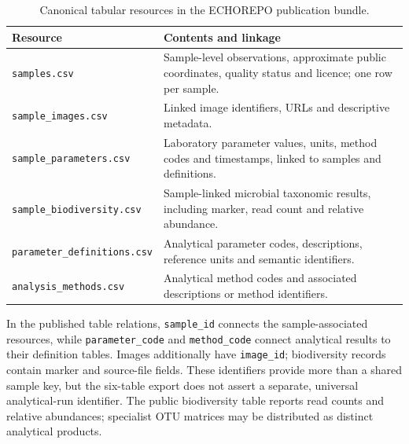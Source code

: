 \documentclass[11pt,a4paper]{article}
\newcommand{\code}[1]{\texttt{#1}}
\begin{document}
\begin{table}[htbp]
\centering\small
\caption{Canonical tabular resources in the ECHOREPO publication bundle.}
\label{tab:canonical}
\begin{tabularx}{\linewidth}{@{}p{4.7cm}X@{}}
\toprule
Resource & Contents and linkage \\
\midrule
\code{samples.csv} & Sample-level observations, approximate public coordinates, quality status and licence; one row per sample.\\
\code{sample\_images.csv} & Linked image identifiers, URLs and descriptive metadata.\\
\code{sample\_parameters.csv} & Laboratory parameter values, units, method codes and timestamps, linked to samples and definitions.\\
\code{sample\_biodiversity.csv} & Sample-linked microbial taxonomic results, including marker, read count and relative abundance.\\
\code{parameter\_definitions.csv} & Analytical parameter codes, descriptions, reference units and semantic identifiers.\\
\code{analysis\_methods.csv} & Analytical method codes and associated descriptions or method identifiers.\\
\bottomrule
\end{tabularx}
\end{table}

In the published table relations, \code{sample\_id} connects the sample-associated resources, while \code{parameter\_code} and \code{method\_code} connect analytical results to their definition tables. Images additionally have \code{image\_id}; biodiversity records contain marker and source-file fields. These identifiers provide more than a shared sample key, but the six-table export does not assert a separate, universal analytical-run identifier. The public biodiversity table reports read counts and relative abundances; specialist OTU matrices may be distributed as distinct analytical products.
\end{document}

